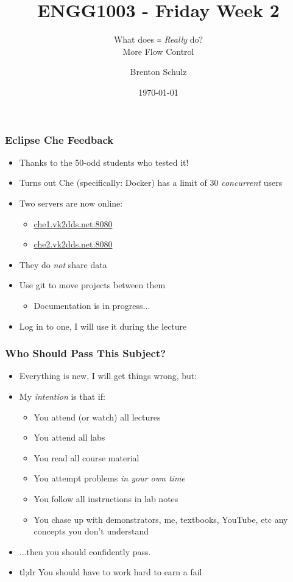 \documentclass[14pt]{beamer}
\title{ENGG1003 - Friday Week 2}
\subtitle{What does \texttt{=} \textit{Really} do?\\More Flow Control}
\author{Brenton Schulz}
\institute{University of Newcastle}
\date{\today}
\begin{document}
\titlepage

\begin{frame}
\frametitle{Eclipse Che Feedback}
\begin{itemize}
\item Thanks to the 50-odd students who tested it!
\item Turns out Che (specifically: Docker) has a limit of 30 \textit{concurrent} users
\item Two servers are now online:
	\begin{itemize}
		\item \url{che1.vk2dds.net:8080}
		\item \url{che2.vk2dds.net:8080}
	\end{itemize}
\item They do \textit{not} share data
\item Use git to move projects between them
	\begin{itemize}
		\item Documentation is in progress...
	\end{itemize}
\item Log in to one, I will use it during the lecture
\end{itemize}
\end{frame}

\begin{frame}
\frametitle{Who Should Pass This Subject?}
\begin{itemize}
\item Everything is new, I will get things wrong, but:
\item My \textit{intention} is that if:
	\begin{itemize}
		\item You attend (or watch) all lectures
		\item You attend all labs
		\item You read all course material
		\item You attempt problems \textit{in your own time}
		\item You follow all instructions in lab notes
		\item You chase up with demonstrators, me, textbooks, YouTube, etc any concepts you don't understand
	\end{itemize}
\item ...then you should confidently pass.
\item tl;dr You should have to work hard to earn a fail
\end{itemize}
\end{frame}
\end{document}
